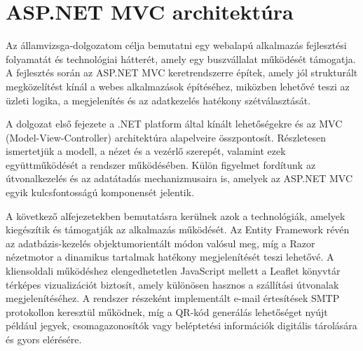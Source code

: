 
\section{ASP.NET MVC architektúra}

\indent Az államvizsga-dolgozatom célja bemutatni egy webalapú alkalmazás fejlesztési folyamatát és technológiai hátterét, amely egy buszvállalat működését támogatja. A fejlesztés során az ASP.NET MVC keretrendszerre építek, amely jól strukturált megközelítést kínál a webes alkalmazások építéséhez, miközben lehetővé teszi az üzleti logika, a megjelenítés és az adatkezelés hatékony szétválasztását.

A dolgozat első fejezete a .NET platform által kínált lehetőségekre és az MVC (Model-View-Controller) architektúra alapelveire összpontosít. Részletesen ismertetjük a modell, a nézet és a vezérlő szerepét, valamint ezek együttműködését a rendszer működésében. Külön figyelmet fordítunk az útvonalkezelés és az adatátadás mechanizmusaira is, amelyek az ASP.NET MVC egyik kulcsfontosságú komponensét jelentik.

A következő alfejezetekben bemutatásra kerülnek azok a technológiák, amelyek kiegészítik és támogatják az alkalmazás működését. Az Entity Framework révén az adatbázis-kezelés objektumorientált módon valósul meg, míg a Razor nézetmotor a dinamikus tartalmak hatékony megjelenítését teszi lehetővé. A kliensoldali működéshez elengedhetetlen JavaScript mellett a Leaflet könyvtár térképes vizualizációt biztosít, amely különösen hasznos a szállítási útvonalak megjelenítéséhez. A rendszer részeként implementált e-mail értesítések SMTP protokollon keresztül működnek, míg a QR-kód generálás lehetőséget nyújt például jegyek, csomagazonosítók vagy beléptetési információk digitális tárolására és gyors elérésére.

